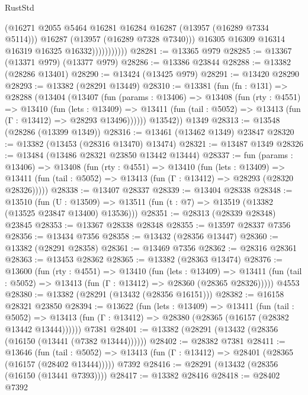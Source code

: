 \begin{lexlean}{RustStd}
\begin{coremodule}
                            (@16271 @2055 @5464 @16281 @16284 @16287 (@13957 (@16289 @7334 @5114)))
                            @16287
                            (@13957 (@16289 @7328 @7340)))
                          @16305
                          @16309
                          @16314
                          @16319
                          @16325
                          @16332)))))))))))
@28281 := @13365 @979
@28285 := @13367 (@13371 @979) (@13377 @979)
@28286 := @13386 @23844
@28288 := @13382 (@28286 @13401)
@28290 := @13424 (@13425 @979)
@28291 := @13420 @28290
@28293 := @13382 (@28291 @13449)
@28310 := @13381
    (fun (fn : @131) =>
    @28288
      (@13404
        (@13407
          (fun (params : @13406) =>
          @13408
            (fun (rty : @4551) =>
            @13410
              (fun (lets : @13409) =>
              @13411 (fun (tail : @5052) => @13413 (fun (Γ : @13412) => @28293 @13496))))))
        @13542))
    @1349
@28313 := @13548 (@28286 (@13399 @1349))
@28316 := @13461 (@13462 @1349) @23847
@28320 := @13382 (@13453 (@28316 @13470) @13474)
@28321 := @13487 @1349
@28326 := @13484 (@13486 @28321 @23850 @13442 @13444)
@28337 := fun (params : @13406) =>
  @13408
    (fun (rty : @4551) =>
    @13410
      (fun (lets : @13409) =>
      @13411 (fun (tail : @5052) => @13413 (fun (Γ : @13412) => @28293 (@28320 @28326)))))
@28338 := @13407 @28337
@28339 := @13404 @28338
@28348 := @13510
    (fun (U : @13509) => @13511 (fun (t : @7) => @13519 (@13382 (@13525 @23847 @13400) @13536)))
@28351 := @28313 (@28339 @28348) @23845
@28353 := @13367 @28338 @28348
@28355 := @13597 @28337 @7356
@28356 := @13434 @7356
@28358 := @13432 (@28356 @13447)
@28360 := @13382 (@28291 @28358)
@28361 := @13469 @7356
@28362 := @28316 @28361
@28363 := @13453 @28362
@28365 := @13382 (@28363 @13474)
@28376 := @13600
    (fun (rty : @4551) =>
    @13410
      (fun (lets : @13409) =>
      @13411 (fun (tail : @5052) => @13413 (fun (Γ : @13412) => @28360 (@28365 @28326)))))
    @4553
@28380 := @13382 (@28291 (@13432 (@28356 @16151)))
@28382 := @16158 @28321 @23850
@28394 := @13622
    (fun (lets : @13409) =>
    @13411
      (fun (tail : @5052) =>
      @13413 (fun (Γ : @13412) => @28380 (@28365 (@16157 (@28382 @13442 @13444))))))
    @7381
@28401 := @13382 (@28291 (@13432 (@28356 (@16150 (@13441 (@7382 @13444))))))
@28402 := @28382 @7381
@28411 := @13646
    (fun (tail : @5052) => @13413 (fun (Γ : @13412) => @28401 (@28365 (@16157 (@28402 @13444)))))
    @7392
@28416 := @28291 (@13432 (@28356 (@16150 (@13441 @7393))))
@28417 := @13382 @28416
@28418 := @28402 @7392

\end{coremodule}
\end{lexlean}
